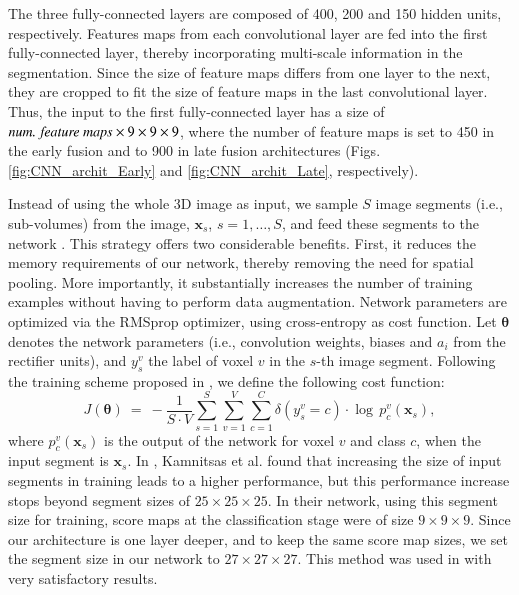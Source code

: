 \documentclass[twoside,espcrc2]{elsarticle}
\newcommand{\tx}[1]{\textrm{#1}}
\newcommand{\vold}[1]{$#1\!\times\!#1\!\times\!#1$}
\renewcommand{\vec}[1]{\mathbf{#1}}
\newcommand{\xx}{\vec x}
\newcommand{\vt}{\boldsymbol{\theta}}
\begin{document}
The three fully-connected layers are composed of 400, 200 and 150 hidden units, respectively. Features maps from each convolutional layer are fed into the first fully-connected layer, thereby incorporating multi-scale information in the segmentation. Since the size of feature maps differs from one layer to the next, they are cropped to fit the size of feature maps in the last convolutional layer. Thus, the input to the first fully-connected layer has a size of $\tx{\emph{num. feature maps}} \times  9 \times 9 \times 9$, where the number of feature maps is set to 450 in the early fusion and to 900 in late fusion architectures (Figs. \ref{fig:CNN_archit_Early} and \ref{fig:CNN_archit_Late}, respectively).

Instead of using the whole 3D image as input, we sample $S$ image segments (i.e., sub-volumes) from the image, $\xx_s$, $s=1, \ldots, S$, and feed these segments to the network \cite{kamnitsas2017efficient}. This strategy offers two considerable benefits. First, it reduces the memory requirements of our network, thereby removing the need for spatial pooling. More importantly, it substantially increases the number of training examples without having to perform data augmentation. Network parameters are optimized via the RMSprop optimizer, using cross-entropy as cost function. Let $\vt$ denotes the network parameters (i.e., convolution weights, biases and $a_i$ from the rectifier units), and $y^v_s$ the label of voxel $v$ in the $s$-th image segment. Following the training scheme proposed in \cite{kamnitsas2017efficient}, we define the following cost function:
\begin{equation}
    J(\vt) \ = \ 
    -\frac{1}{S\!\cdot\!V} \sum^{S}_{s=1} \sum^{V}_{v=1} \sum^{C}_{c=1} \delta(y^v_s = c) \cdot \log \, p^v_c(\xx_s),
\end{equation}
where $p^v_c(\xx_s)$ is the output of the network for voxel $v$ and class $c$, when the input segment is $\xx_s$. 
In \cite{kamnitsas2017efficient}, Kamnitsas et al. found that increasing the size of input segments in training leads to a higher 
performance, but this performance increase stops beyond segment sizes of \vold{25}. In their network, using this segment size for training, score
maps at the classification stage were of size \vold{9}. Since our architecture is one layer deeper, and to keep the same score map sizes, we set 
the segment size in our network to \vold{27}. This method was used in \cite{DolzNeuro2017} with very satisfactory results.
\end{document}
